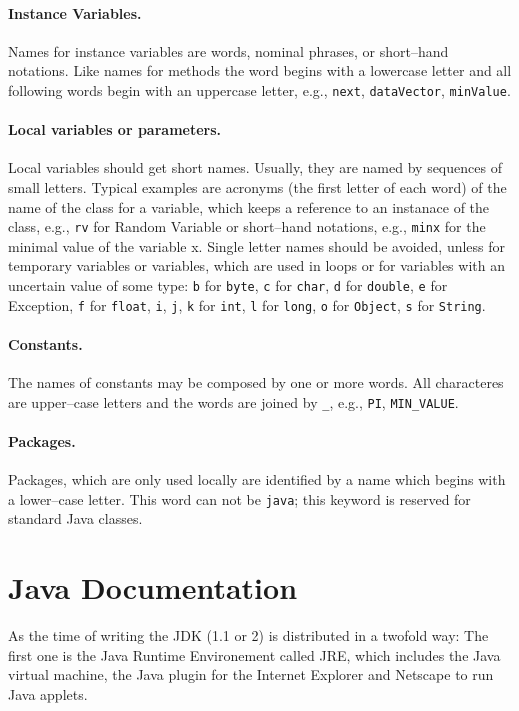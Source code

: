 \paragraph{Instance Variables.} Names for instance variables are
  words, nominal phrases, or short--hand notations. Like names for
  methods the word begins with a lowercase letter and all following
  words begin with an uppercase letter, e.g., \verb|next|,
  \verb|dataVector|,
\verb|minValue|.

\paragraph{Local variables or parameters.} Local variables should get
  short  names. Usually, they are named by sequences of small
  letters. Typical examples are acronyms (the first letter of each
  word) of the name of the class for a variable, which keeps a
  reference to an instanace of the class, e.g., \verb|rv| for Random
  Variable or short--hand notations, e.g., \verb|minx| for the minimal
  value of the variable x. Single letter names should be avoided,
  unless for temporary variables or variables, which are used in
  loops or for variables with an uncertain value of some type:
\verb|b| for \verb|byte|, \verb|c| for \verb|char|, \verb|d| for
  \verb|double|, \verb|e| for Exception, \verb|f| for \verb|float|,
  \verb|i|,
\verb|j|, \verb|k| for \verb|int|, \verb|l| for \verb|long|, \verb|o|
  for \verb|Object|, \verb|s| for \verb|String|.

\paragraph{Constants.} The names of constants may be composed by one
  or more words. All characteres are upper--case letters and the words
  are joined by \verb|_|, e.g., \verb|PI|,  \verb|MIN_VALUE|.

\paragraph{Packages.} Packages, which are only used locally are
  identified by a name which begins with a lower--case letter. This
  word can not be \verb|java|; this keyword is reserved for
  standard Java classes.



\section{Java Documentation}
As the time of writing the JDK (1.1 or 2) is distributed in
a twofold way: The first one is the Java Runtime Environement called JRE,
which includes the Java virtual machine, the Java plugin for 
the Internet Explorer
and Netscape to run Java applets. 


